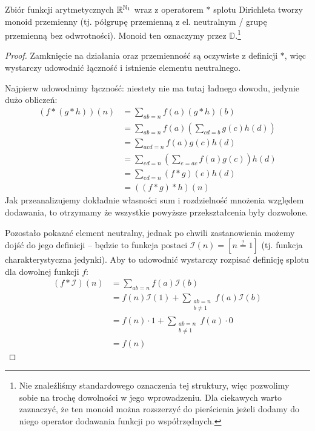 \begin{theorem}
	\label{nt:dirichletmonoid}
	Zbiór funkcji arytmetycznych \(\mathbb{R}^{\mathbb{N}_1}\) wraz z operatorem \(*\) splotu Dirichleta tworzy
	monoid przemienny (tj. półgrupę przemienną z el. neutralnym / grupę przemienną bez odwrotności).
	Monoid ten oznaczymy przez \(\mathbb D\).\footnote{Nie znaleźliśmy standardowego oznaczenia tej struktury, więc pozwolimy sobie na trochę
		dowolności w jego wprowadzeniu. Dla ciekawych warto zaznaczyć, że ten monoid można rozszerzyć do pierścienia jeżeli dodamy do niego
		operator dodawania funkcji po współrzędnych.}
\end{theorem}
\begin{proof}
	Zamknięcie na działania oraz przemienność są oczywiste z definicji \(*\), więc wystarczy
	udowodnić łączność i istnienie elementu neutralnego.

	Najpierw udowodnimy łączność: niestety nie ma tutaj ładnego dowodu,
	jedynie dużo obliczeń:
	\begin{align*}
		(f * (g * h))(n) & = \sum_{ab = n} f(a) (g*h)(b)                             \\
		                 & = \sum_{ab = n} f(a) \left(\sum_{cd = b} g(c) h(d)\right) \\
		                 & = \sum_{acd = n} f(a) g(c) h(d)                           \\
		                 & = \sum_{ed = n} \left(\sum_{e = ac} f(a) g(c)\right) h(d) \\
		                 & = \sum_{ed = n} (f * g)(e) h(d)                           \\
		                 & = ((f * g) * h)(n)
	\end{align*}
	Jak przeanalizujemy dokładnie własności sum i rozdzielność mnożenia względem
	dodawania, to otrzymamy że wszystkie powyższe przekształcenia były dozwolone.

	Pozostało pokazać element neutralny, jednak po chwili zastanowienia możemy dojść
	do jego definicji -- będzie to funkcja postaci \(\mathcal I(n) = [n \stackrel{?}{=} 1]\) (tj. funkcja charakterystyczna jedynki).
	Aby to udowodnić wystarczy rozpisać definicję splotu dla dowolnej funkcji \(f\):
	\begin{align*}
		(f * \mathcal I)(n) & = \sum_{ab = n} f(a) \mathcal I(b)            \\
		                    & = f(n) \mathcal I(1) + \sum_{\substack{ab = n \\ b \neq 1}} f(a) \mathcal I(b) \\
		                    & = f(n) \cdot 1 + \sum_{\substack{ab = n       \\ b \neq 1}} f(a) \cdot 0             \\
		                    & = f(n)
	\end{align*}
\end{proof}

